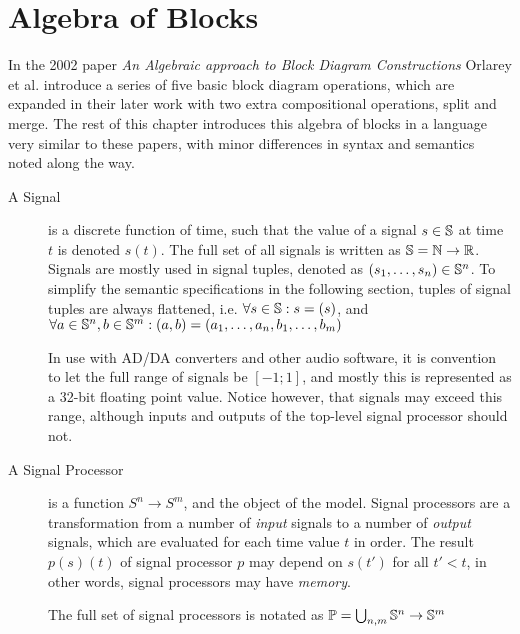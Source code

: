 \section{Algebra of Blocks}

In the 2002 paper \emph{An Algebraic approach to Block Diagram Constructions}\autocite{orlarey2002} Orlarey et al. introduce a series of five
basic block diagram operations, which are expanded in their later work\autocite{orlarey2004} with two extra
compositional operations, split and merge. The rest of this chapter introduces this algebra of blocks in a
language very similar to these papers, with minor differences in syntax and semantics noted along the way.

\begin{description}
  \item[A Signal] is a discrete function of time, such that the value of a signal $s \in \mathbb{S}$ at time
        $t$ is denoted $s(t)$. The full set of all signals is written as
        $\mathbb{S} = \mathbb N \rightarrow \mathbb R$. Signals are mostly used in signal tuples, denoted as $(s_1, \dots, s_n) \in \mathbb{S}^n$. To
        simplify the semantic specifications in the following section, tuples of signal tuples are always flattened,
        i.e. $\forall s \in \mathbb{S}: s = (s)$, and $\forall a \in \mathbb{S}^n, b \in \mathbb{S}^m : (a, b) = (a_1, \dots, a_n, b_1, \dots, b_m)$

        In use with AD/DA converters and other audio software, it is convention to let the full range of signals be
        $[-1; 1]$, and mostly this is represented as a 32-bit floating point value. Notice however, that
        signals may exceed this range, although inputs and outputs of the top-level signal processor should not.

        \newpage
  \item[A Signal Processor] is a function $S^n \rightarrow S^m$, and the object of the model. Signal processors are
        a transformation from a number of \emph{input} signals to a number of \emph{output}
        signals, which are evaluated for each time value $t$ in order. The result
        $p(s)(t)$ of signal processor $p$ may depend on $s(t')$ for
        all $t' < t$, in other words, signal processors may have \emph{memory}.

        The full set of signal processors is notated as $\mathbb P = \bigcup_{n,m} \mathbb{S}^n \rightarrow \mathbb{S}^m$


\end{description}
